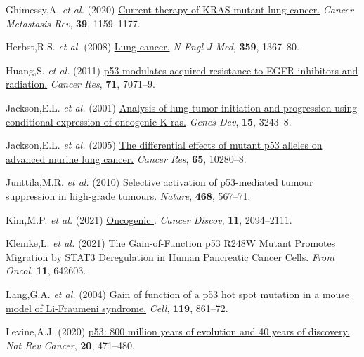 \begin{CSLReferences}{1}{0}
\leavevmode{}%
Ghimessy,A. \emph{et al.} (2020) \href{https://doi.org/10.1007/s10555-020-09903-9}{Current therapy of KRAS-mutant lung cancer.} \emph{Cancer Metastasis Rev}, \textbf{39}, 1159--1177.

\leavevmode{}%
Herbst,R.S. \emph{et al.} (2008) \href{https://doi.org/10.1056/nejmra0802714}{Lung cancer.} \emph{N Engl J Med}, \textbf{359}, 1367--80.

\leavevmode{}%
Huang,S. \emph{et al.} (2011) \href{https://doi.org/10.1158/0008-5472.can-11-0128}{p53 modulates acquired resistance to EGFR inhibitors and radiation.} \emph{Cancer Res}, \textbf{71}, 7071--9.

\leavevmode{}%
Jackson,E.L. \emph{et al.} (2001) \href{https://doi.org/10.1101/gad.943001}{Analysis of lung tumor initiation and progression using conditional expression of oncogenic K-ras.} \emph{Genes Dev}, \textbf{15}, 3243--8.

\leavevmode{}%
Jackson,E.L. \emph{et al.} (2005) \href{https://doi.org/10.1158/0008-5472.can-05-2193}{The differential effects of mutant p53 alleles on advanced murine lung cancer.} \emph{Cancer Res}, \textbf{65}, 10280--8.

\leavevmode{}%
Junttila,M.R. \emph{et al.} (2010) \href{https://doi.org/10.1038/nature09526}{Selective activation of p53-mediated tumour suppression in high-grade tumours.} \emph{Nature}, \textbf{468}, 567--71.

\leavevmode{}%
Kim,M.P. \emph{et al.} (2021) \href{https://doi.org/10.1158/2159-8290.cd-20-1228}{Oncogenic }. \emph{Cancer Discov}, \textbf{11}, 2094--2111.

\leavevmode{}%
Klemke,L. \emph{et al.} (2021) \href{https://doi.org/10.3389/fonc.2021.642603}{The Gain-of-Function p53 R248W Mutant Promotes Migration by STAT3 Deregulation in Human Pancreatic Cancer Cells.} \emph{Front Oncol}, \textbf{11}, 642603.

\leavevmode{}%
Lang,G.A. \emph{et al.} (2004) \href{https://doi.org/10.1016/j.cell.2004.11.006}{Gain of function of a p53 hot spot mutation in a mouse model of Li-Fraumeni syndrome.} \emph{Cell}, \textbf{119}, 861--72.

\leavevmode{}%
Levine,A.J. (2020) \href{https://doi.org/10.1038/s41568-020-0262-1}{p53: 800 million years of evolution and 40 years of discovery.} \emph{Nat Rev Cancer}, \textbf{20}, 471--480.


\end{CSLReferences}
